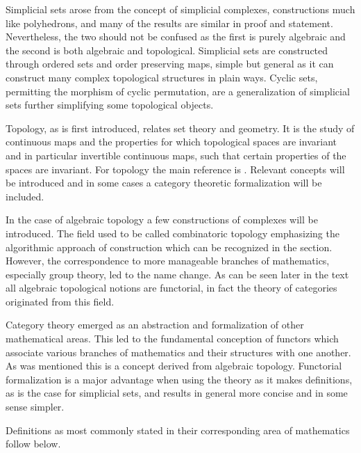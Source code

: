 \documentclass[../../main.tex]{subfiles}
\begin{document}
    Simplicial sets arose from the concept of simplicial complexes, constructions much like polyhedrons, and many of the results are similar in proof and statement. Nevertheless, the two should not be confused as the first is purely algebraic and the second is both algebraic and topological. Simplicial sets are constructed through ordered sets and order preserving maps, simple but general as it can construct many complex topological structures in plain ways. Cyclic sets, permitting the morphism of cyclic permutation, are a generalization of simplicial sets further simplifying some topological objects. 
    
    Topology, as is first introduced, relates set theory and geometry. It is the study of continuous maps and the properties for which topological spaces are invariant and in particular invertible continuous maps, such that certain properties of the spaces are invariant. For topology the main reference is \cite{armstrong-basictop}. Relevant concepts will be introduced and in some cases a category theoretic formalization will be included. 
    
    In the case of algebraic topology a few constructions of complexes will be introduced. The field used to be called combinatoric topology emphasizing the algorithmic approach of construction which can be recognized in the section. However, the correspondence to more manageable branches of mathematics, especially group theory, led to the name change. As can be seen later in the text all algebraic topological notions are functorial, in fact the theory of categories originated from this field. 
    
    Category theory emerged as an abstraction and formalization of other mathematical areas. This led to the fundamental conception of functors which associate various branches of mathematics and their structures with one another. As was mentioned this is a concept derived from algebraic topology. Functorial formalization is a major advantage when using the theory as it makes definitions, as is the case for simplicial sets, and results in general more concise and in some sense simpler. 
    
    Definitions as most commonly stated in their corresponding area of mathematics follow below. 
    
\end{document}
